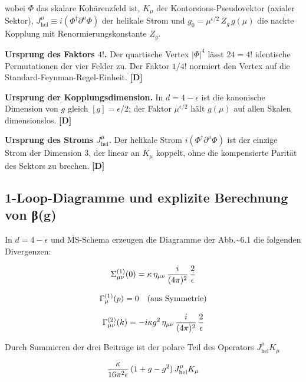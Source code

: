 ﻿\documentclass[11pt,letterpaper]{article}
\begin{document}
wobei $\Phi$ das skalare Kohärenzfeld ist, $K_\mu$ der Kontorsions-Pseudovektor (axialer Sektor), $J_{\text{hel}}^\mu \equiv i(\Phi^\dagger \partial^\mu \Phi)$ der helikale Strom und $g_0 = \mu^{\epsilon/2}\,Z_g\,g(\mu)$ die nackte Kopplung mit Renormierungskonstante $Z_g$.

\textbf{Ursprung des Faktors $4!$.} Der quartische Vertex $|\Phi|^4$ lässt $24 = 4!$ identische Permutationen der vier Felder zu. Der Faktor $1/4!$ normiert den Vertex auf die Standard-Feynman-Regel-Einheit. \textbf{[D]}

\textbf{Ursprung der Kopplungsdimension.} In $d = 4 - \epsilon$ ist die kanonische Dimension von $g$ gleich $[g] = \epsilon/2$; der Faktor $\mu^{\epsilon/2}$ hält $g(\mu)$ auf allen Skalen dimensionslos. \textbf{[D]}

\textbf{Ursprung des Stroms $J_{\text{hel}}^\mu$.} Der helikale Strom $i(\Phi^\dagger \partial^\mu \Phi)$ ist der einzige Strom der Dimension 3, der linear an $K_\mu$ koppelt, ohne die kompensierte Parität des Sektors zu brechen. \textbf{[D]}
\subsection{1-Loop-Diagramme und explizite Berechnung von β(g)}
In $d = 4 - \epsilon$ und $\overline{\text{MS}}$-Schema erzeugen die Diagramme der Abb.\textasciitilde{}6.1 die folgenden Divergenzen:

\begin{equation*}
  \resizebox{\ifdim\width>\linewidth \linewidth\else\width\fi}{!}{$\displaystyle \Sigma_{\mu\nu}^{(1)}(0) = \kappa\,\eta_{\mu\nu}\,\frac{i}{(4\pi)^2}\,\frac{2}{\epsilon}$}
\end{equation*}

\begin{equation*}
  \resizebox{\ifdim\width>\linewidth \linewidth\else\width\fi}{!}{$\displaystyle \Gamma_\mu^{(1)}(p) = 0 \quad \text{(aus Symmetrie)}$}
\end{equation*}

\begin{equation*}
  \resizebox{\ifdim\width>\linewidth \linewidth\else\width\fi}{!}{$\displaystyle \Gamma_{\mu\nu}^{(2)}(k) = -i\kappa g^2\,\eta_{\mu\nu}\,\frac{i}{(4\pi)^2}\,\frac{2}{\epsilon}$}
\end{equation*}

Durch Summieren der drei Beiträge ist der polare Teil des Operators $J_{\text{hel}}^\mu K_\mu$

\begin{equation*}
  \resizebox{\ifdim\width>\linewidth \linewidth\else\width\fi}{!}{$\displaystyle \frac{\kappa}{16\pi^2\epsilon}\,(1 + g - g^2)\,J_{\text{hel}}^\mu K_\mu$}
\end{equation*}
\end{document}
